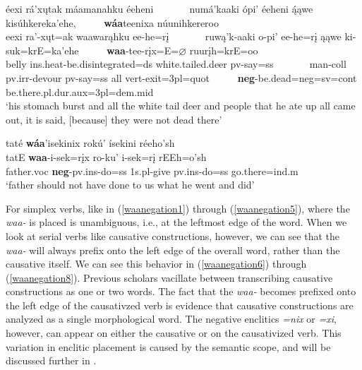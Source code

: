 \begin{exe}
\begin{xlist}
	\item\label{waanegation9}
	\glll éexi rá'xųtak máamanahku éeheni ~ ~ ~ ~  numá'kaaki ópi' éeheni ą́ąwe kisúhkereka'ehe, ~ ~ ~ \textbf{wáa}teenixa núunihkereroo\\
	eexi ra'-xųt=ak waawarąhku ee-he=rį ~ ~ ~ ~ ruwą'k-aaki o-pi' ee-he=rį ąąwe ki-suk=krE=ka'ehe ~ ~ ~   \textbf{waa}-tee-rįx=E=$\varnothing$ ruurįh=krE=oo\\
	\textnormal{belly} ins.heat-\textnormal{be.disintegrated}=ds \textnormal{white.tailed.deer} pv-\textnormal{say}=ss ~ ~ ~ ~  \textnormal{man}-coll pv.irr-\textnormal{devour} pv-\textnormal{say}=ss \textnormal{all} vert-\textnormal{exit}=3pl=quot ~ ~ ~  \textbf{neg}-\textnormal{be.dead}=neg=sv=cont \textnormal{be.there}.pl.dur.aux=3pl=dem.mid\\
	\glt `his stomach burst and all the white tail deer and people that he ate up all came out, it is said, [because] they were not dead there' \citep[171]{hollow1973a}
	
	
	\item\label{waanegation10}
	\glll taté \textbf{wáa}'isekinix rokú' ísekini réeho'sh\\
	tatE \textbf{waa}-i-sek=rįx ro-ku' i-sek=rį rEEh=o'sh\\
	\textnormal{father}.voc \textbf{neg}-pv.ins-\textnormal{do}=ss 1s.pl-\textnormal{give} pv.ins-\textnormal{do}=ss \textnormal{go.there}=ind.m\\
	\glt `father should not have done to us what he went and did' \citep[184]{hollow1973a}
	
	\end{xlist}

\end{exe}

For simplex verbs, like in (\ref{waanegation1}) through (\ref{waanegation5}), where the \textit{waa-} is placed is unambiguous, i.e., at the leftmost edge of the word. When we look at serial verbs like causative constructions, however, we can see that the \textit{waa-} will always prefix onto the left edge of the overall word, rather than the causative itself. We can see this behavior in (\ref{waanegation6}) through (\ref{waanegation8}). Previous scholars vacillate between transcribing causative constructions as one or two words. The fact that the \textit{waa-} becomes prefixed onto the left edge of the causativzed verb is evidence that causative constructions are analyzed as a single morphological word. The negative enclitics \textit{=nix} or \textit{=xi}, however, can appear on either the causative or on the causativized verb. This variation in enclitic placement is caused by the semantic scope, and will be discussed further in .


